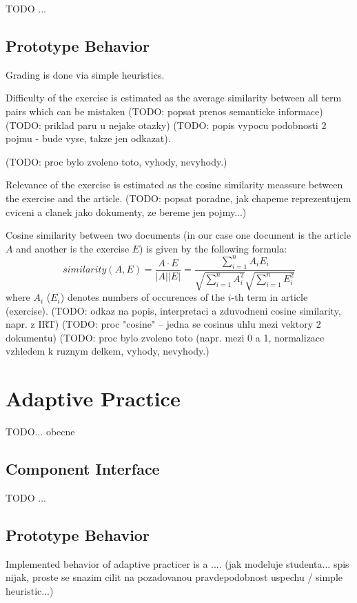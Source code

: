 \documentclass[a4paper, 12pt, twoside]{fithesis2}		%
\renewcommand{\_}{\leavevmode \kern0.0em\vbox{\hrule width0.4em}}
\begin{document}
TODO ...

\subsection{Prototype Behavior}

Grading is done via simple heuristics.

Difficulty of the exercise is estimated as the average similarity between all term pairs which can be mistaken (TODO: popsat prenos semanticke informace) (TODO: priklad paru u nejake otazky) (TODO: popis vypocu podobnosti 2 pojmu - bude vyse, takze jen odkazat).

(TODO: proc bylo zvoleno toto, vyhody, nevyhody.)

Relevance of the exercise is estimated as the cosine similarity meassure between the exercise and the article.
(TODO: popsat poradne, jak chapeme reprezentujem cviceni a clanek jako dokumenty, ze bereme jen pojmy...)

Cosine similarity between two documents (in our case one document is the article $A$ and another is the exercise $E$) is given by the following formula:
$$
similarity(A, E)
= \frac{A \cdot E}{|A| |E|}
= \frac{\sum_{i=1}^{n} A_i E_i}{\sqrt{\sum_{i=1}^{n} A_i^2}\sqrt{\sum_{i=1}^{n} E_i^2}}
$$
where $A_i$ ($E_i$) denotes numbers of occurences of the $i$-th term in article (exercise).
(TODO: odkaz na popis, interpretaci a zduvodneni cosine similarity, napr. z IRT)
(TODO: proc "cosine" -- jedna se cosinus uhlu mezi vektory 2 dokumentu)
(TODO: proc bylo zvoleno toto (napr. mezi 0 a 1, normalizace vzhledem k ruznym delkem, vyhody, nevyhody.)

\section{Adaptive Practice}
\label{sec:smartoo-practice}

TODO... obecne

\subsection{Component Interface}

TODO ...

\subsection{Prototype Behavior}

Implemented behavior of adaptive practicer is a .... (jak modeluje studenta... spis nijak, proste se snazim cilit na pozadovanou pravdepodobnost uspechu / simple heuristic...)
\end{document}
